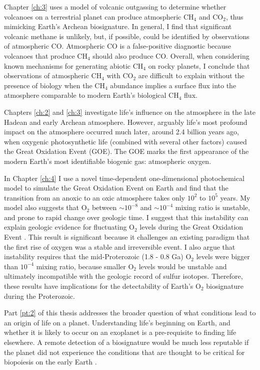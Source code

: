 Chapter \ref{ch:3} uses a model of volcanic outgassing to determine whether volcanoes on a terrestrial planet can produce atmospheric CH$_4$ and CO$_2$, thus mimicking Earth's Archean biosignature. In general, I find that significant volcanic methane is unlikely, but, if possible, could be identified by observations of atmospheric CO. Atmospheric CO is a false-positive diagnostic because volcanoes that produce CH$_4$ should also produce CO. Overall, when considering known mechanisms for generating abiotic CH$_4$ on rocky planets, I conclude that observations of atmospheric CH$_4$ with CO$_2$ are difficult to explain without the presence of biology when the CH$_4$ abundance implies a surface flux into the atmosphere comparable to modern Earth's biological CH$_4$ flux.

Chapters \ref{ch:2} and \ref{ch:3} investigate life's influence on the atmosphere in the late Hadean and early Archean atmosphere. However, arguably life's most profound impact on the atmosphere occurred much later, around 2.4 billion years ago, when oxygenic photosynthetic life (combined with several other factors) caused the Great Oxidation Event (GOE). The GOE marks the first appearance of the modern Earth's most identifiable biogenic gas: atmospheric oxygen.

In Chapter \ref{ch:4} I use a novel time-dependent one-dimensional photochemical model to simulate the Great Oxidation Event on Earth and find that the transition from an anoxic to an oxic atmosphere takes only $10^2$ to $10^5$ years. My model also suggests that O$_2$ between $\sim 10^{-8}$ and $\sim 10^{-4}$ mixing ratio is unstable, and prone to rapid change over geologic time. I suggest that this instability can explain geologic evidence for fluctuating O$_2$ levels during the Great Oxidation Event \citep{Poulton_2021}. This result is significant because it challenges an existing paradigm \citep{Goldblatt_2006} that the first rise of oxygen was a stable and irreversible event. I also argue that instability requires that the mid-Proterozoic (1.8 - 0.8 Ga) O$_2$ levels were bigger than $10^{-4}$ mixing ratio, because smaller O$_2$ levels would be unstable and ultimately incompatible with the geologic record of sulfur isotopes. Therefore, these results have implications for the detectability of Earth's O$_2$ biosignature during the Proterozoic.

Part \ref{pt:2} of this thesis addresses the broader question of what conditions lead to an origin of life on a planet. Understanding life's beginning on Earth, and whether it is likely to occur on an exoplanet is a pre-requisite to finding life elsewhere. A remote detection of a biosignature would be much less reputable if the planet did not experience the conditions that are thought to be critical for biopoiesis on the early Earth \citep{Catling_2018}.

